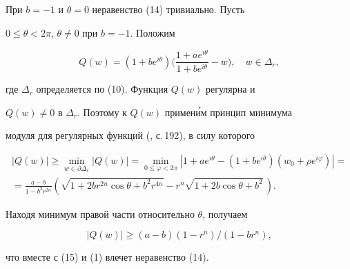  


\begin{pf} 


При $b=-1$ и $\theta=0$ неравенство (14) тривиально. Пусть 


$0\le\theta<2\pi$, $\theta\ne 0$ при $b=-1$. Положим 


\begin{equation} 


Q(w)=(1+be^{i\theta})\biggl(\frac{1+ae^{i\theta}}{1+be^{i\theta}}-w 


\biggr),\quad w\in\Delta_r, 


\end{equation} 


где $\Delta_r$ определяется по (10). Функция $Q(w)$ регулярна и 


$Q(w)\ne 0$ в $\Delta_r$. Поэтому к $Q(w)$ примен\'им принцип минимума 


модуля для регулярных функций (\cite{11}, с.\,192), в силу которого 


\begin{multline*} 


|Q(w)|\ge\min_{w\in\partial\Delta_r}|Q(w)|= 


\min_{0\le\varphi<2\pi}|1+ae^{i\theta}-(1+be^{i\theta}) 


(w_0+\rho e^{i\varphi})|= \\ 


=\frac{a-b}{1-b^2r^{2n}}\left( 


\sqrt{1+2br^{2n}\cos\theta+b^2r^{4n}}-r^n 


\sqrt{1+2b\cos\theta+b^2}\,\right). 


\end{multline*} 


Находя минимум правой части относительно $\theta$, получаем 


$$ 


|Q(w)|\ge (a-b)(1-r^n)/(1-br^n), 


$$ 


что вместе с (15) и (1) влечет неравенство (14). 


\end{pf} 


 


